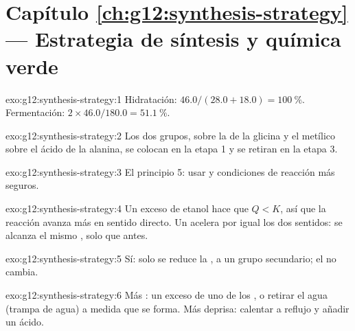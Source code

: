 \section*{Capítulo \ref{ch:g12:synthesis-strategy} --- Estrategia de síntesis y química verde}

\begin{solution}{exo:g12:synthesis-strategy:1}
Hidratación: $46.0/(28.0 + 18.0) = \qty{100}{\percent}$. Fermentación:
$2 \times 46.0/180.0 = \qty{51.1}{\percent}$.
\end{solution}

\begin{solution}{exo:g12:synthesis-strategy:2}
Los dos grupos,  sobre la  de la glicina y el  metílico
sobre el ácido de la alanina, se colocan en la etapa 1 y se retiran en
la etapa 3.
\end{solution}

\begin{solution}{exo:g12:synthesis-strategy:3}
El principio 5: usar  y condiciones de reacción más seguros.
\end{solution}

\begin{solution}{exo:g12:synthesis-strategy:4}
Un exceso de etanol hace que $Q < K$, así que la reacción avanza más en
sentido directo. Un  acelera por igual los dos sentidos: se
alcanza el mismo , solo que antes.
\end{solution}

\begin{solution}{exo:g12:synthesis-strategy:5}
Sí: solo se reduce la , a un grupo  secundario; el  no
cambia.
\end{solution}

\begin{solution}{exo:g12:synthesis-strategy:6}
Más : un exceso de uno de los , o retirar el agua (trampa
de agua) a medida que se forma. Más deprisa: calentar a reflujo y añadir
un  ácido.
\end{solution}

